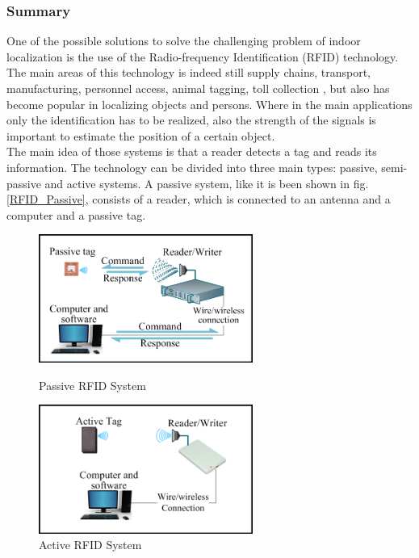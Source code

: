 \subsubsection*{Summary} 
One of the possible solutions to solve the challenging problem of indoor localization is the use of the Radio-frequency Identification (RFID) technology. The main areas of this technology is indeed still supply chains, transport, manufacturing, personnel access, animal tagging, toll collection \cite{Bai_overviewof},  but also has become popular in localizing objects and persons. Where in the main applications only the identification has to be realized, also the strength of the signals is important to estimate the position of a certain object.\\
The main idea of those systems is that a reader detects a tag and reads its information. The technology can be divided into three main types: passive, semi-passive and active systems. A passive system, like it is been shown in fig. \ref{RFID_Passive}, consists of a reader, which is connected to an antenna and a computer and a passive tag.\\
\begin{figure}[!htbp]
\centering
\begin{minipage}{.5\textwidth}
\centering
\includegraphics[width = 7cm]{Pictures/RFID_Passive}%
\caption{Passive RFID System}
\label{RFID_Passive}
\end{minipage}%
\begin{minipage}{.5\textwidth}
\centering
\includegraphics[width = 7cm]{Pictures/RFID_Active}%
\caption{Active RFID System}
\label{RFID_Active}
\end{minipage}
\end{figure}\\
